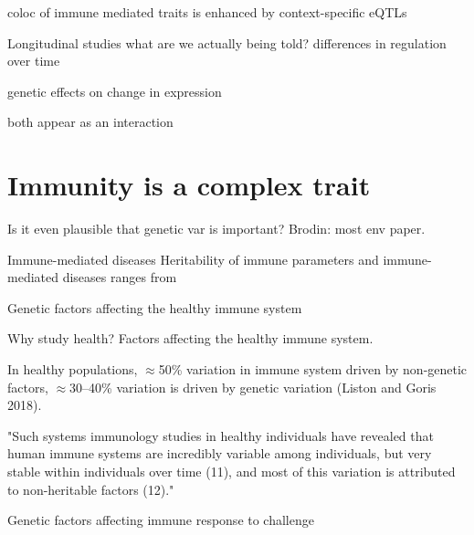\begin{outline}


coloc of immune mediated traits is enhanced by context-specific eQTLs



Longitudinal studies
    what are we actually being told?
    differences in regulation over time

    genetic effects on change in expression

    both appear as an interaction

\section{Immunity is a complex trait}

Is it even plausible that genetic var is important?
    Brodin: most env paper.

Immune-mediated diseases
    Heritability of immune parameters and immune-mediated diseases
        ranges from 


Genetic factors affecting the healthy immune system

    Why study health?
    Factors affecting the healthy immune system.

    In healthy populations, $\approx$50\% variation in immune system driven by non-genetic factors, $\approx$30–40\% variation is driven by genetic variation (Liston and Goris 2018).

    "Such systems  immunology studies in  healthy individuals have  revealed that human immune  systems are incredibly  variable among individuals,  but very stable within  individuals over time (11),  and most of this variation is  attributed to non-heritable  factors (12)."

Genetic factors affecting immune response to challenge


\end{outline}
